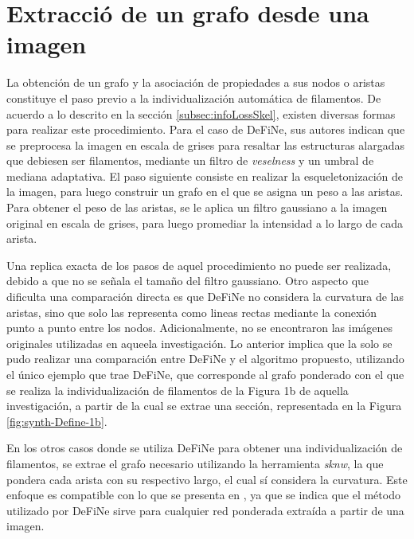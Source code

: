 \section{Extracci\'o de un grafo desde una imagen}
La obtenci\'on de un grafo y la asociaci\'on de propiedades a sus nodos o aristas constituye el paso previo a la individualizaci\'on autom\'atica de filamentos. De acuerdo a lo descrito en la secci\'on \ref{subsec:infoLossSkel}, existen diversas formas para realizar este procedimiento. Para el caso de DeFiNe, sus autores indican que se preprocesa la imagen en escala de grises para resaltar las estructuras alargadas que debiesen ser filamentos, mediante un filtro de {\it veselness} y un umbral de mediana adaptativa. El paso siguiente consiste en realizar la esqueletonizaci\'on de la imagen, para luego construir un grafo en el que se asigna un peso a las aristas. 
Para obtener el peso de las aristas, se le aplica un filtro gaussiano a la imagen original en escala de grises, para luego promediar la intensidad a lo largo de cada arista.


Una replica exacta de los pasos de aquel procedimiento no puede ser realizada, debido a que no se se\~nala el tama\~no del filtro gaussiano. Otro aspecto que dificulta una comparaci\'on directa es que DeFiNe no considera la curvatura de las aristas, sino que solo las representa como lineas rectas mediante la conexión punto a punto entre los nodos. Adicionalmente, no se encontraron las im\'agenes originales utilizadas en aqueela investigaci\'on. Lo anterior implica que la solo se pudo realizar una comparaci\'on entre DeFiNe y el algoritmo propuesto, utilizando el \'unico ejemplo que trae DeFiNe, que corresponde al grafo ponderado con el que se realiza la individualizaci\'on de filamentos de la Figura 1b de aquella investigaci\'on, a partir de la cual se extrae una secci\'on, representada en la Figura \ref{fig:synth-Define-1b}.


En los otros casos donde se utiliza DeFiNe para obtener una individualizaci\'on de filamentos, se extrae el grafo necesario utilizando la herramienta {\it sknw}, la que pondera cada arista con su respectivo largo, el cual s\'i considera la curvatura. Este enfoque es compatible con lo que se presenta en \cite{breuer2015define}, ya que se indica que el m\'etodo utilizado por DeFiNe sirve para cualquier red ponderada extra\'ida a partir de una imagen.


